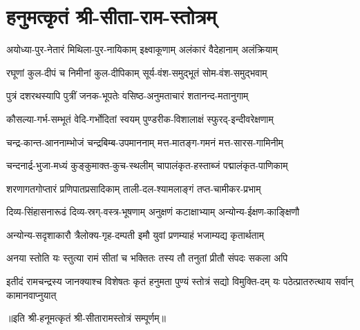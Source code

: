 
\section{हनुमत्कृतं श्री-सीता-राम-स्तोत्रम्}

\twolineshloka
{अयोध्या-पुर-नेतारं मिथिला-पुर-नायिकाम्}
{इक्ष्वाकूणाम् अलंकारं वैदेहानाम् अलंक्रियाम्} %

\twolineshloka
{रघूणां कुल-दीपं च निमीनां कुल-दीपिकाम्}
{सूर्य-वंश-समुद्भूतं सोम-वंश-समुद्भवाम्} %

\twolineshloka
{पुत्रं दशरथस्यापि पुत्रीं जनक-भूपतेः}
{वसिष्ठ-अनुमताचारं शतानन्द-मतानुगाम्} %

\twolineshloka
{कौसल्या-गर्भ-सम्भूतं वेदि-गर्भोदितां स्वयम्}
{पुण्डरीक-विशालाक्षं स्फुरद्-इन्दीवरेक्षणाम्} %

\twolineshloka
{चन्द्र-कान्त-आननाम्भोजं चन्द्रबिम्ब-उपमाननाम्}
{मत्त-मातङ्ग-गमनं मत्त-सारस-गामिनीम्}

\twolineshloka
{चन्दनार्द्र-भुजा-मध्यं कुङ्कुमाक्त-कुच-स्थलीम्}
{चापालंकृत-हस्ताब्जं पद्मालंकृत-पाणिकाम्} %

\twolineshloka
{शरणागतगोप्तारं प्रणिपातप्रसादिकाम्}
{ताली-दल-श्यामलाङ्गं तप्त-चामीकर-प्रभाम्} %

\twolineshloka
{दिव्य-सिंहासनारूढं दिव्य-स्रग्-वस्त्र-भूषणाम्} %
{अनुक्षणं कटाक्षाभ्याम् अन्योन्य-ईक्षण-काङ्क्षिणौ}

\twolineshloka
{अन्योन्य-सदृशाकारौ त्रैलोक्य-गृह-दम्पती}
{इमौ युवां प्रणम्याहं भजाम्यद्य कृतार्थताम्} %

\twolineshloka
{अनया स्तोति यः स्तुत्या रामं सीतां च भक्तितः}
{तस्य तौ तनुतां प्रीतौ संपदः सकला अपि} %

\threelineshloka
{इतीदं रामचन्द्रस्य जानक्याश्च विशेषतः}
{कृतं हनुमता पुण्यं स्तोत्रं सद्यो विमुक्ति-दम्}
{यः पठेत्प्रातरुत्थाय सर्वान् कामानवाप्नुयात्} %

॥इति श्री-हनूमत्कृतं श्री-सीतारामस्तोत्रं सम्पूर्णम्॥
